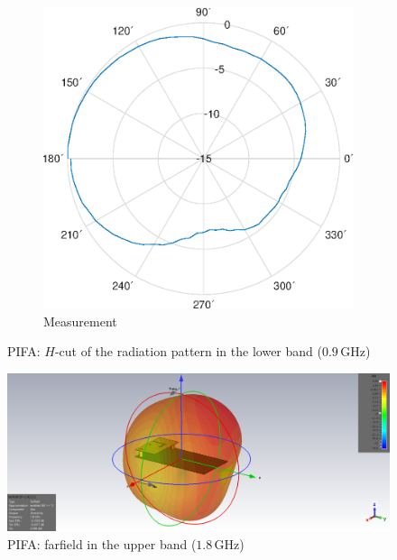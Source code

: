 \documentclass[11pt,a4paper]{article}
\begin{document}
\begin{figure}[!ht]
\begin{subfigure}{.4\textwidth}
                \includegraphics[width=\textwidth]{src/pifa-meas-radiation-h-0G9Hz.eps}
                \caption{\label{fig:pifa-meas-radiation-h-0G9Hz}Measurement}
            \end{subfigure}
            \caption{\label{fig:pifa-radiation-h-0G9Hz}PIFA: $H$-cut of the radiation pattern in the lower band ($0.9\, \mathrm{GHz}$)}
        \end{figure}

        \begin{figure}[!ht]
            \centering
            \includegraphics[width=.8\textwidth]{src/pifa-farfield-1G8Hz.png}
            \caption{\label{fig:pifa-farfield-1G8Hz}PIFA: farfield in the upper band ($1.8\, \mathrm{GHz}$)}
        \end{figure}
\end{document}
